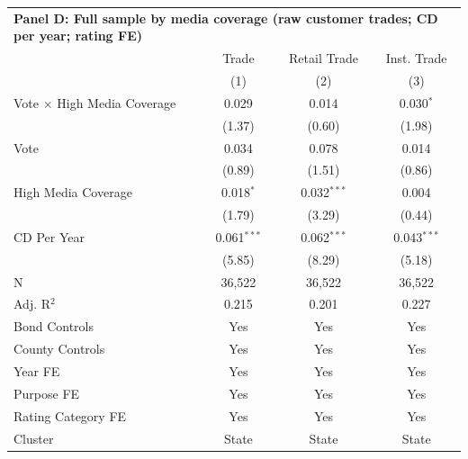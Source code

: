 \begingroup
\centering
\begin{tabular*}{\textwidth}{@{\extracolsep{\fill}}lccc}
\multicolumn{5}{l}{\textbf{Panel D: Full sample by media coverage (raw customer trades; CD per year; rating FE)}}\\

\addlinespace
   \toprule
                                      & Trade         & Retail Trade  & Inst. Trade\\  
                                      & (1)           & (2)           & (3)\\  
   \midrule 
   Vote $\times$ High Media Coverage  & 0.029         & 0.014         & 0.030$^{*}$\\   
                                      & (1.37)       & (0.60)       & (1.98)\\   
   Vote                               & 0.034         & 0.078         & 0.014\\   
                                      & (0.89)       & (1.51)       & (0.86)\\   
   High Media Coverage                & 0.018$^{*}$   & 0.032$^{***}$ & 0.004\\   
                                      & (1.79)       & (3.29)       & (0.44)\\   
   CD Per Year                        & 0.061$^{***}$ & 0.062$^{***}$ & 0.043$^{***}$\\   
                                      & (5.85)       & (8.29)       & (5.18)\\   
   \hline
   N                       & 36,522        & 36,522        & 36,522\\  
   Adj. R$^2$                     & 0.215         & 0.201         & 0.227\\  
   Bond Controls                      & Yes           & Yes           & Yes\\  
   County Controls                    & Yes           & Yes           & Yes\\  
   Year FE                            & Yes           & Yes           & Yes\\  
   Purpose FE                         & Yes           & Yes           & Yes\\  
   Rating Category FE                 & Yes           & Yes           & Yes\\  
   Cluster              & State & State & State\\  
   \bottomrule
\end{tabular*}
\par\endgroup
